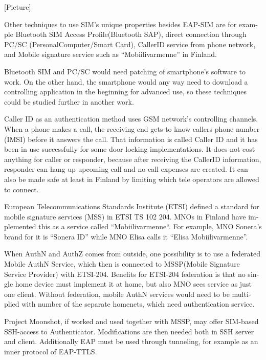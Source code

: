 \documentclass[12pt,a4paper,english]{tutthesis}
\begin{document}
\begin{otherlanguage}{english}
[Picture]

Other techniques  to use SIM's unique properties besides EAP-SIM
are for example Bluetooth SIM Access Profile(Bluetooth  SAP), 
direct connection through PC/SC (Personal\-Computer/Smart\- Card),
CallerID service from phone network, and
Mobile signature service such as ``Mobiilivarmenne'' in Finland.



Bluetooth SIM and PC/SC would need patching of smartphone's software
to work.  On the other hand, the smartphone would any way need to
download  a controlling application
in the beginning for advanced use, so these techniques could be
studied further in another work.

Caller ID as an authentication method uses GSM network's controlling
channels. When a phone makes a call, the receiving end gets 
to know callers phone number (IMSI) before it answers the call.
That information is called Caller ID and it has been in use
successfully for some door locking implementations. 
It does not cost anything for caller or responder,
because after receiving the CallerID  information, responder can hang
up upcoming call and no call expenses are created.
 It can also be made safe at least in Finland
by limiting which tele operators are allowed to connect.
















European Telecommunications Standards Institute (ETSI) defined a
standard for mobile signature services (MSS) in ETSI TS 102 204.
MNOs in Finland have implemented this as a 
service called ``Mobiilivarmenne``. 
For example, MNO Sonera's brand for  it is ``Sonera ID'' while MNO Elisa calls it
``Elisa Mobiilivarmenne''.

When AuthN and AuthZ comes from outside, one possibility is to use a
federated Mobile AuthN Service, which then is connected to MSSP(Mobile
Signature Service Provider) with ETSI-204. Benefits for ETSI-204
federation is that no single home device must implement it at home,
but also MNO sees service as just one client.  Without federation,
mobile AuthN services would need to be multiplied with number of the
separate homenets, which need authentication service.



Project Moonshot, if worked and used together with MSSP, may offer
SIM-based SSH-access to Authenticator. Modifications are then needed 
both in SSH server and client. Additionally EAP must be used through
tunneling, for example as an inner protocol of EAP-TTLS.\cite{moonshot}


\end{otherlanguage}
\end{document}
